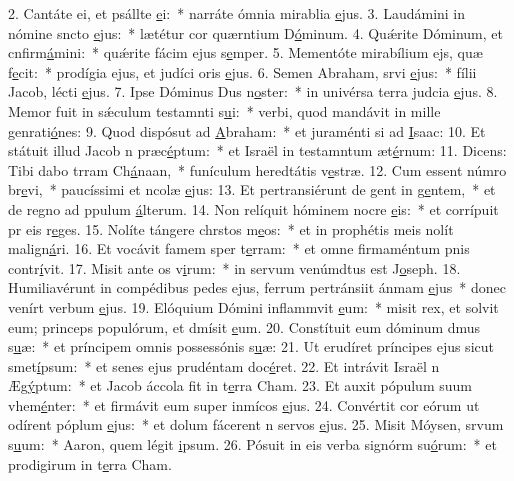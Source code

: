 2. Cantáte ei, et psállte \uline{e}i:~* narráte ómnia mirablia \uline{e}jus.
3. Laudámini in nómine sncto \uline{e}jus:~* lætétur cor quærntium D\uline{ó}minum.
4. Quǽrite Dóminum, et cnfirm\uline{á}mini:~* quǽrite fácim ejus s\uline{e}mper.
5. Mementóte mirabílium ejs, quæ f\uline{e}cit:~* prodígia ejus, et judíci oris \uline{e}jus.
6. Semen Abraham, srvi \uline{e}jus:~* fílii Jacob, lécti \uline{e}jus.
7. Ipse Dóminus Dus n\uline{o}ster:~* in univérsa terra judcia \uline{e}jus.
8. Memor fuit in sǽculum testamnti s\uline{u}i:~* verbi, quod mandávit in mille genrati\uline{ó}nes:
9. Quod dispósut ad \uline{A}braham:~* et juraménti si ad \uline{I}saac:
10. Et státuit illud Jacob n præc\uline{é}ptum:~* et Israël in testamntum æt\uline{é}rnum:
11. Dicens: Tibi dabo trram Ch\uline{á}naan,~* funículum heredtátis v\uline{e}stræ.
12. Cum essent númro br\uline{e}vi,~* paucíssimi et ncolæ \uline{e}jus:
13. Et pertransiérunt de gent in g\uline{e}ntem,~* et de regno ad ppulum \uline{á}lterum.
14. Non relíquit hóminem nocre \uline{e}is:~* et corrípuit pr eis r\uline{e}ges.
15. Nolíte tángere chrstos m\uline{e}os:~* et in prophétis meis nolít malign\uline{á}ri.
16. Et vocávit famem sper t\uline{e}rram:~* et omne firmaméntum pnis contr\uline{í}vit.
17. Misit ante os v\uline{i}rum:~* in servum venúmdtus est J\uline{o}seph.
18. Humiliavérunt in compédibus pedes ejus, ferrum pertránsiit ánmam \uline{e}jus~* donec venírt verbum \uline{e}jus.
19. Elóquium Dómini inflammvit \uline{e}um:~* misit rex, et solvit eum; princeps populórum, et dmísit \uline{e}um.
20. Constítuit eum dóminum dmus s\uline{u}æ:~* et príncipem omnis possessónis s\uline{u}æ:
21. Ut erudíret príncipes ejus sicut smet\uline{í}psum:~* et senes ejus prudéntam doc\uline{é}ret.
22. Et intrávit Israël n Æg\uline{ý}ptum:~* et Jacob áccola fit in t\uline{e}rra Cham.
23. Et auxit pópulum suum vhem\uline{é}nter:~* et firmávit eum super inmícos \uline{e}jus.
24. Convértit cor eórum ut odírent póplum \uline{e}jus:~* et dolum fácerent n servos \uline{e}jus.
25. Misit Móysen, srvum s\uline{u}um:~* Aaron, quem légit \uline{i}psum.
26. Pósuit in eis verba signórm su\uline{ó}rum:~* et prodigirum in t\uline{e}rra Cham.
